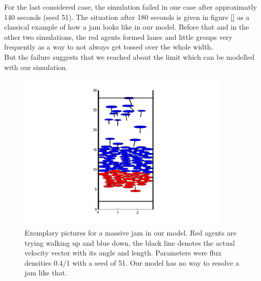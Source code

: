 \noi For the last considered case, the simulation failed in one case after approximatly 140 seconds (seed 51). The situation after 180 seconds is given in figure \ref{} as a classical example of how a jam looks like in our model. Before that and in the other two simulations, the red agents formed lanes and little groups very frequently as a way to not always get tossed over the whole width.\\
But the failure suggests that we reached about the limit which can be modelled with our simulation.
\begin{figure}[h!]
	\centering
		\includegraphics[width=0.90\textwidth]{pictures/up1down04seed51.png}
	\caption{Exemplary pictures for a massive jam in our model. Red agents are trying walking up and blue down, the black line denotes the actual velocity vector with its angle and length. Parameters were flux densities 0.4/1 with a seed of 51. Our model has no way to resolve a jam like that.}
	\label{fig:up1down03seed51}
\end{figure}

